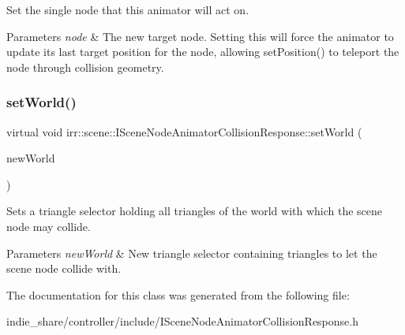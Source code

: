Set the single node that this animator will act on. 


\begin{DoxyParams}{Parameters}
{\em node} & The new target node. Setting this will force the animator to update its last target position for the node, allowing set\+Position() to teleport the node through collision geometry. \\
\hline
\end{DoxyParams}
\mbox{\label{classirr_1_1scene_1_1ISceneNodeAnimatorCollisionResponse_a42aa84d4843a734f8dd1f20b5c92ef06}} 
\subsubsection{\texorpdfstring{set\+World()}{setWorld()}}
{\footnotesize\ttfamily virtual void irr\+::scene\+::\+I\+Scene\+Node\+Animator\+Collision\+Response\+::set\+World (\begin{DoxyParamCaption}\item[{\hyperlink{classirr_1_1scene_1_1ITriangleSelector}{I\+Triangle\+Selector} $\ast$}]{new\+World }\end{DoxyParamCaption})\hspace{0.3cm}{\ttfamily [pure virtual]}}



Sets a triangle selector holding all triangles of the world with which the scene node may collide. 


\begin{DoxyParams}{Parameters}
{\em new\+World} & New triangle selector containing triangles to let the scene node collide with. \\
\hline
\end{DoxyParams}


The documentation for this class was generated from the following file\+:\begin{DoxyCompactItemize}
\item 
indie\+\_\+share/controller/include/I\+Scene\+Node\+Animator\+Collision\+Response.\+h\end{DoxyCompactItemize}
